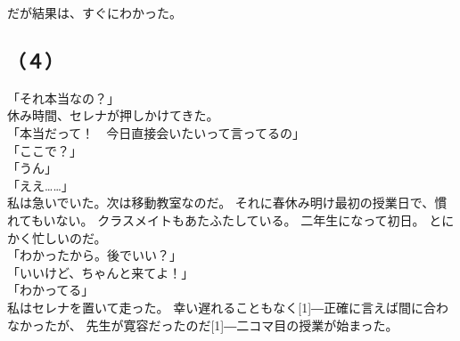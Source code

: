 \documentclass[../IHMain]{subfiles}
\begin{document}
だが結果は、すぐにわかった。

\subsection*{（４）}
「それ本当なの？」\\
休み時間、セレナが押しかけてきた。\\
「本当だって！　今日直接会いたいって言ってるの」\\
「ここで？」\\
「うん」\\
「ええ……」\\
私は急いでいた。次は移動教室なのだ。
それに春休み明け最初の授業日で、慣れてもいない。
クラスメイトもあたふたしている。
二年生になって初日。
とにかく忙しいのだ。\\
「わかったから。後でいい？」\\
「いいけど、ちゃんと来てよ！」\\
「わかってる」\\
私はセレナを置いて走った。
幸い遅れることもなく\scalebox{3}[1]{―}正確に言えば間に合わなかったが、
先生が寛容だったのだ\scalebox{3}[1]{―}二コマ目の授業が始まった。\\
\end{document}
